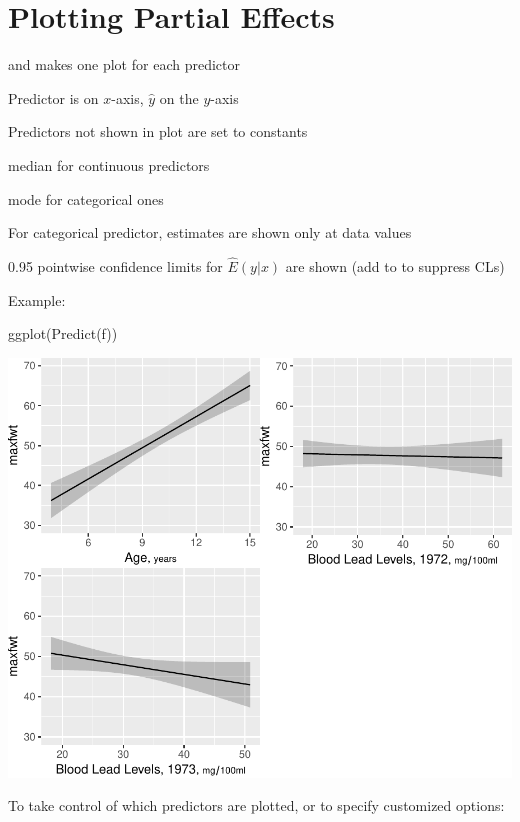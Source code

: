 \section{Plotting Partial Effects}
\bi
\item {} and  makes one plot for each predictor
\item Predictor is on $x$-axis, $\hat{y}$ on the $y$-axis
\item Predictors not shown in plot are set to constants
 \bi
 \item median for continuous predictors
 \item mode for categorical ones
 \ei
\item For categorical predictor, estimates are shown only at data
  values
\item 0.95 pointwise confidence limits for $\hat{E}(y|x)$ are shown
  (add  to  to suppress CLs)
\item Example: \ipacue
\begin{Schunk}
\begin{Sinput}
ggplot(Predict(f))
\end{Sinput}


\centerline{\includegraphics[width=\maxwidth]{rmsintro-unnamed-chunk-8-1} }

\end{Schunk}
\item To take control of which predictors are plotted, or to specify
  customized options: \ipacue
